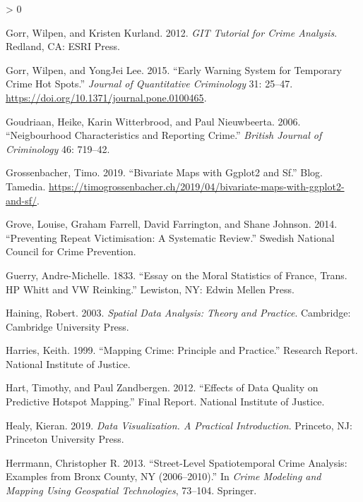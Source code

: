 \documentclass[
  krantz2]{krantz}
\newlength{\cslhangindent}
\newenvironment{CSLReferences}[2] %
 {%
  \setlength{\parindent}{0pt}
  \ifodd #1 \everypar{\setlength{\hangindent}{\cslhangindent}}\ignorespaces\fi
  \ifnum #2 > 0
  \setlength{\parskip}{#2\baselineskip}
  \fi
 }%
 {}
\begin{document}
\begin{CSLReferences}{1}{0}
\leavevmode\hypertarget{ref-Gorr_2012}{}%
Gorr, Wilpen, and Kristen Kurland. 2012. \emph{GIT Tutorial for Crime Analysis}. Redland, CA: ESRI Press.

\leavevmode\hypertarget{ref-Gorr_2015}{}%
Gorr, Wilpen, and YongJei Lee. 2015. {``Early Warning System for Temporary Crime Hot Spots.''} \emph{Journal of Quantitative Criminology} 31: 25--47. \url{https://doi.org/10.1371/journal.pone.0100465}.

\leavevmode\hypertarget{ref-Goudriaan_2006}{}%
Goudriaan, Heike, Karin Witterbrood, and Paul Nieuwbeerta. 2006. {``Neigbourhood Characteristics and Reporting Crime.''} \emph{British Journal of Criminology} 46: 719--42.

\leavevmode\hypertarget{ref-Grossenbacher_2019}{}%
Grossenbacher, Timo. 2019. {``Bivariate Maps with Ggplot2 and Sf.''} Blog. Tamedia. \url{https://timogrossenbacher.ch/2019/04/bivariate-maps-with-ggplot2-and-sf/}.

\leavevmode\hypertarget{ref-Grove_2014}{}%
Grove, Louise, Graham Farrell, David Farrington, and Shane Johnson. 2014. {``Preventing Repeat Victimisation: A Systematic Review.''} Swedish National Council for Crime Prevention.

\leavevmode\hypertarget{ref-Guerry_1833}{}%
Guerry, Andre-Michelle. 1833. {``Essay on the Moral Statistics of France, Trans. HP Whitt and VW Reinking.''} Lewiston, NY: Edwin Mellen Press.

\leavevmode\hypertarget{ref-Haining_2003}{}%
Haining, Robert. 2003. \emph{Spatial Data Analysis: Theory and Practice}. Cambridge: Cambridge University Press.

\leavevmode\hypertarget{ref-Harries_1999}{}%
Harries, Keith. 1999. {``Mapping Crime: Principle and Practice.''} Research Report. National Institute of Justice.

\leavevmode\hypertarget{ref-Hart_2012}{}%
Hart, Timothy, and Paul Zandbergen. 2012. {``Effects of Data Quality on Predictive Hotspot Mapping.''} Final Report. National Institute of Justice.

\leavevmode\hypertarget{ref-Healy_2019}{}%
Healy, Kieran. 2019. \emph{Data Visualization. A Practical Introduction}. Princeto, NJ: Princeton University Press.

\leavevmode\hypertarget{ref-Herrmann_2013}{}%
Herrmann, Christopher R. 2013. {``Street-Level Spatiotemporal Crime Analysis: Examples from Bronx County, NY (2006--2010).''} In \emph{Crime Modeling and Mapping Using Geospatial Technologies}, 73--104. Springer.


\end{CSLReferences}
\end{document}
